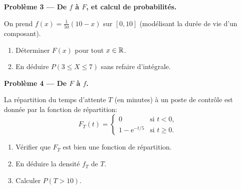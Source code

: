 \atrou[1.5cm]{%

}
\medskip

\vspace{1em}
\textbf{Problème 3 --- De $f$ à $F$, et calcul de probabilités.}

On prend $f(x)=\tfrac{1}{50}(10-x)$ sur $[0,10]$
(modélisant la durée de vie d'un composant).
\begin{enumerate}
  \item Déterminer $F(x)$ pour tout $x\in\mathbb{R}$.
  \item En déduire $P(3\le X\le 7)$ sans refaire d'intégrale.
\end{enumerate}

\medskip

\vspace{1em}
\textbf{Problème 4 --- De $F$ à $f$.}

La répartition du temps
d'attente $T$ (en minutes) à un poste de contrôle est donnée par la fonction de répartition:
\[
  F_T(t)=
  \begin{cases}
    0 & \text{si } t<0,\\
    1-\mathrm{e}^{-t/5} & \text{si } t\ge 0.
  \end{cases}\]
\begin{enumerate}
  \item Vérifier que $F_T$ est bien une fonction de répartition.
  \item En déduire la densité $f_T$ de $T$.
  \item Calculer $P(T>10)$.
\end{enumerate}


